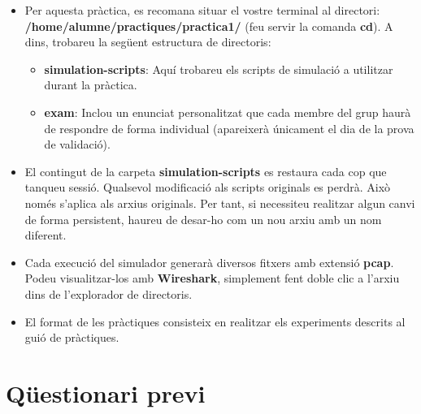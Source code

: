 \documentclass[12pt,a4paper]{article}
\begin{document}
\begin{itemize}
\item Per aquesta pràctica, es recomana situar el vostre terminal al directori: \newline \textbf{/home/alumne/practiques/practica1/} (feu servir la comanda \textbf{cd}). A dins, trobareu la següent estructura de directoris:
\begin{itemize}
\item\textbf{simulation-scripts}: Aquí trobareu els scripts de simulació a utilitzar durant la pràctica.
\item\textbf{exam}: Inclou un enunciat personalitzat que cada membre del grup haurà de respondre de forma individual (apareixerà únicament el dia de la prova de validació).
\end{itemize}

\item El contingut de la carpeta \textbf{simulation-scripts} es restaura cada cop que tanqueu sessió. Qualsevol modificació als scripts originals es perdrà. Això només s'aplica als arxius originals. Per tant, si necessiteu realitzar algun canvi de forma persistent, haureu de desar-ho com un nou arxiu amb un nom diferent.

\item Cada execució del simulador generarà diversos fitxers amb extensió \textbf{pcap}. Podeu visualitzar-los amb \textbf{Wireshark}, simplement fent doble clic a l'arxiu dins de l'explorador de directoris.

\item El format de les pràctiques consisteix en realitzar els experiments descrits al guió de pràctiques.
\end{itemize}

 \newpage
\section {Qüestionari previ}
\end{document}

